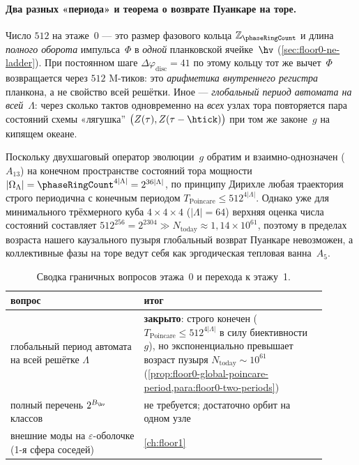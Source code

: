 \paragraph{Два разных «периода» и теорема о возврате Пуанкаре на торе.}
\label{para:floor0-two-periods}
Число $512$ на этаже~0 --- это размер фазового кольца $\mathbb{Z}_{\phaseRingCount}$
и длина \emph{полного оборота} импульса~$\Phi$ в \emph{одной} планковской ячейке~$\hv$
(\cref{sec:floor0-ne-ladder}).
При постоянном шаге $\Delta\varphi_{\mathrm{disc}}=41$ по этому кольцу тот же вычет~$\Phi$
возвращается через $512$ M-тиков: это \emph{арифметика внутреннего регистра} планкона,
а не свойство всей решётки.
Иное --- \emph{глобальный период автомата на всей}~$\Lambda$:
через сколько тактов одновременно на \emph{всех} узлах тора повторяется пара состояний
схемы «лягушка'' $\bigl(Z(\tau), Z(\tau-\htick)\bigr)$ при том же законе~$g$ на кипящем океане.

\begin{proposition}
\label{prop:floor0-global-poincare-period}
Поскольку двухшаговый оператор эволюции~$g$ обратим и взаимно-однозначен ($A_{13}$) на конечном пространстве состояний тора мощности $|\Omega_\Lambda| = \phaseRingCount^{4|\Lambda|} = 2^{36|\Lambda|}$, по принципу Дирихле любая траектория строго периодична с конечным периодом $T_{\mathrm{Poincare}} \le 512^{4|\Lambda|}$.
Однако уже для минимального трёхмерного куба $4\times 4\times 4$ ($|\Lambda|=64$) верхняя оценка числа состояний составляет $512^{256} = 2^{2304} \gg N_{\mathrm{today}} \approx 1{,}14\times 10^{61}$, поэтому в пределах возраста нашего каузального пузыря глобальный возврат Пуанкаре невозможен, а коллективные фазы на торе ведут себя как эргодическая тепловая ванна~$A_5$.
\end{proposition}

\begin{table}[htbp]
  \centering
  \caption{Сводка граничных вопросов этажа~0 и перехода к этажу~1.}
  \label{tab:floor0-open}
  \footnotesize
  \setlength{\tabcolsep}{4pt}
  \begin{tabular}{@{}p{0.38\linewidth}p{0.52\linewidth}@{}}
    \toprule
    вопрос & итог \\
    \midrule
    глобальный период автомата на всей решётке $\Lambda$ &
    \textbf{закрыто}: строго конечен ($T_{\mathrm{Poincare}} \le 512^{4|\Lambda|}$ в силу биективности~$g$), но экспоненциально превышает возраст пузыря $N_{\mathrm{today}}\sim 10^{61}$ (\cref{prop:floor0-global-poincare-period,para:floor0-two-periods}) \\
    полный перечень $2^{B_{\hv}}$ классов &
    не требуется; достаточно орбит на одном узле \\
    внешние моды на $\varepsilon$-оболочке (1-я сфера соседей) &
    \cref{ch:floor1} \\
    \bottomrule
  \end{tabular}
\end{table}

